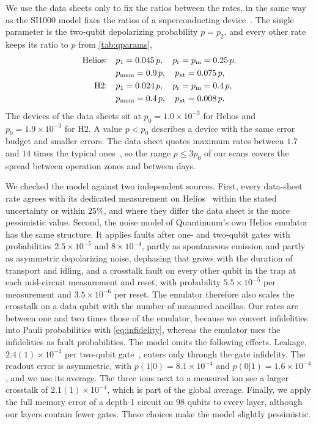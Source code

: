 We use the data sheets only to fix the ratios between the rates, in the same way as the SI1000 model fixes the ratios of a superconducting device~\cite{gidney2021honeycomb}. The single parameter is the two-qubit depolarizing probability $p=p_2$, and every other rate keeps its ratio to $p$ from \autoref{tab:qparams},
\begin{align}
  \text{Helios:}\quad &p_1=0.045\,p,\quad p_{\rm r}=p_{\rm m}=0.25\,p,\nonumber\\
  &p_{\rm mem}=0.9\,p,\quad p_{\rm xt}=0.075\,p,\nonumber\\
  \text{H2:}\quad &p_1=0.024\,p,\quad p_{\rm r}=p_{\rm m}=0.4\,p,\nonumber\\
  &p_{\rm mem}=0.4\,p,\quad p_{\rm xt}=0.008\,p.
  \label{eq:ionmodel}
\end{align}
The devices of the data sheets sit at $p_0=1.0\times10^{-3}$ for Helios and $p_0=1.9\times10^{-3}$ for H2. A value $p<p_0$ describes a device with the same error budget and smaller errors. The data sheet quotes maximum rates between $1.7$ and $14$ times the typical ones~\cite{helios_datasheet}, so the range $p\le3p_0$ of our scans covers the spread between operation zones and between days.

We checked the model against two independent sources. First, every data-sheet rate agrees with its dedicated measurement on Helios~\cite{ransford2026} within the stated uncertainty or within $25\%$, and where they differ the data sheet is the more pessimistic value. Second, the noise model of Quantinuum's own Helios emulator~\cite{quantinuum_emulator} has the same structure. It applies faults after one- and two-qubit gates with probabilities $2.5\times10^{-5}$ and $8\times10^{-4}$, partly as spontaneous emission and partly as asymmetric depolarizing noise, dephasing that grows with the duration of transport and idling, and a crosstalk fault on every other qubit in the trap at each mid-circuit measurement and reset, with probability $5.5\times10^{-5}$ per measurement and $3.5\times10^{-6}$ per reset. The emulator therefore also scales the crosstalk on a data qubit with the number of measured ancillas. Our rates are between one and two times those of the emulator, because we convert infidelities into Pauli probabilities with \autoref{eq:infidelity}, whereas the emulator uses the infidelities as fault probabilities. The model omits the following effects. Leakage, $2.4(1)\times10^{-4}$ per two-qubit gate~\cite{ransford2026}, enters only through the gate infidelity. The readout error is asymmetric, with $p(1|0)=8.1\times10^{-4}$ and $p(0|1)=1.6\times10^{-4}$, and we use its average. The three ions next to a measured ion see a larger crosstalk of $2.1(1)\times10^{-4}$, which is part of the global average. Finally, we apply the full memory error of a depth-1 circuit on 98 qubits to every layer, although our layers contain fewer gates. These choices make the model slightly pessimistic.

